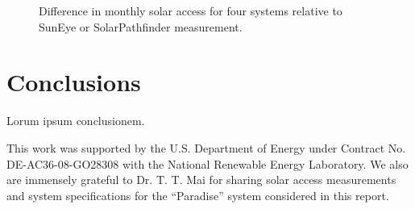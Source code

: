 \documentclass[twocolumn,10pt]{asme2ej}
\begin{document}
\begin{figure}[h!]
\begin{center}
\end{center}
\caption{Difference in monthly solar access for four systems relative to SunEye or SolarPathfinder measurement.}
\label{fig:monthly_solar_access_error}
\end{figure}


\section{Conclusions}

Lorum ipsum conclusionem.


\begin{acknowledgment}
This work was supported by the U.S. Department of Energy under Contract No. DE-AC36-08-GO28308 with the National Renewable Energy Laboratory.  We also are immensely grateful to Dr. T. T. Mai for sharing solar access measurements and system specifications for the ``Paradise'' system considered in this report.
\end{acknowledgment}
\end{document}

